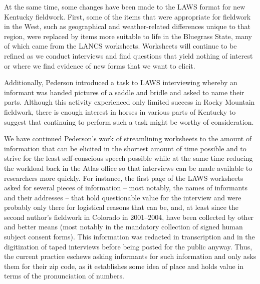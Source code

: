 \documentclass[output=paper]{langscibook}
\begin{document}
At the same time, some changes have been made to the LAWS format for new Kentucky fieldwork. First, some of the items that were appropriate for fieldwork in the West, such as geographical and weather-related differences unique to that region, were replaced by items more suitable to life in the Bluegrass State, many of which came from the LANCS worksheets. Worksheets will continue to be refined as we conduct interviews and find questions that yield nothing of interest or where we find evidence of new forms that we want to elicit. 

Additionally, Pederson introduced a task to LAWS interviewing whereby an informant was handed pictures of a saddle and bridle and asked to name their parts. Although this activity experienced only limited success in Rocky Mountain fieldwork, there is enough interest in horses in various parts of Kentucky to suggest that continuing to perform such a task might be worthy of consideration. 

We have continued Pederson’s work of streamlining worksheets to the amount of information that can be elicited in the shortest amount of time possible and to strive for the least self-conscious speech possible while at the same time reducing the workload back in the Atlas office so that interviews can be made available to researchers more quickly. For instance, the first page of the LAWS worksheets asked for several pieces of information -- most notably, the names of informants and their addresses -- that hold questionable value for the interview and were probably only there for logistical reasons that can be, and, at least since the second author’s fieldwork in Colorado in 2001--2004, have been collected by other and better means (most notably in the mandatory collection of signed human subject consent forms). This information was redacted in transcription and in the digitization of taped interviews before being posted for the public anyway. Thus, the current practice eschews asking informants for such information and only asks them for their zip code, as it establishes some idea of place and holds value in terms of the pronunciation of numbers.  
\end{document}
